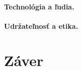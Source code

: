 \documentclass[10pt,twoside,slovak,a4paper]{article}
\begin{document}
 \paragraph{Technológia a ľudia.}
 
 \paragraph{Udržateľnosť a etika.}
 
 

\section{Záver} \label{zaver} %




\newpage

\end{document}
